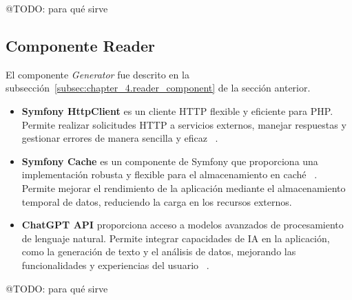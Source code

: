 \colorbox{color_highlight}{@TODO: para qué sirve}

\subsection*{Componente Reader}

El componente \textit{Generator} fue descrito en la subsección~\ref{subsec:chapter_4.reader_component}
de la sección anterior.

\begin{itemize}
    \item \textbf{Symfony HttpClient} es un cliente HTTP flexible y eficiente para PHP. Permite realizar solicitudes
    HTTP a servicios externos, manejar respuestas y gestionar errores de manera sencilla y eficaz
    ~\cite{https://symfony.com/doc/current/http_client.html}.
    \item \textbf{Symfony Cache} es un componente de Symfony que proporciona una implementación robusta y flexible
    para el almacenamiento en caché ~\cite{https://symfony.com/doc/current/components/cache.html}.
    Permite mejorar el rendimiento de la aplicación mediante el almacenamiento temporal de datos, reduciendo la carga en
    los recursos externos.
    \item \textbf{ChatGPT API} proporciona acceso a modelos avanzados de procesamiento de lenguaje natural.
    Permite integrar capacidades de IA en la aplicación, como la generación de texto y el análisis de datos, mejorando
    las funcionalidades y experiencias del usuario ~\cite{https://platform.openai.com/docs/api-reference/chat}.
\end{itemize}

\colorbox{color_highlight}{@TODO: para qué sirve}



